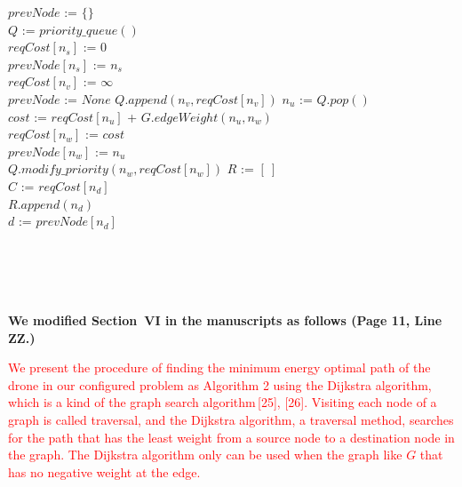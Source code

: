\documentclass[onecolumn]{IEEEconf}
\begin{document}
\begin{description}
\begin{algorithm}[h]
    $prevNode$ := $\{\}$ \\
    $Q$ := $priority\_queue()$ \\
    $reqCost[n_s]$ := 0 \\
    $prevNode[n_s]$ := $n_s$ \\
    {
        {
            $reqCost[n_v]$ := $\infty$ \\
            $prevNode$ := $None$
        }
        $Q.append(n_v, reqCost[n_v])$
    }
    {
	    $n_u$ := $Q.pop()$ \\
        { 
    	    $cost$ := $reqCost[n_u]$ + $G.edgeWeight(n_u, n_w)$ \\
    	    {
    	        $reqCost[n_w]$ := $cost$ \\
    	        $prevNode[n_w]$ := $n_u$ \\
    	        $Q.modify\_priority(n_w, reqCost[n_w])$
    	    }
        }
    }
    $R$ := $[\ ]$ \\
    $C$ := $reqCost[n_d]$ \\ 
    {
    $R.append(n_d)$ \\
    $d$ := $prevNode[n_d]$
    }
    \end{algorithm}
    \SetNlSty{}{\color{black}}{:}
    \SetAlFnt{\color{black}}
    ~\\
    ~\\
    ~\\
    \pagebreak ~\\
	\textbf{We modified Section~VI in the manuscripts as follows (Page 11, Line ZZ.)}\\
    \begin{mdframed}[ linewidth=.75pt, userdefinedwidth=0.9\textwidth]
    \textcolor{red}{
    We present the procedure of finding the minimum energy optimal path of the drone in our configured problem as Algorithm 2 using the Dijkstra algorithm, which is a kind of the graph search algorithm\,[25], [26].
    Visiting each node of a graph is called traversal, and the Dijkstra algorithm, a traversal method, searches for the path that has the least weight from a source node to a destination node in the graph. The Dijkstra algorithm only can be used when the graph like $G$ that has no negative weight at the edge.
}
\end{mdframed}
\end{description}
\end{document}
